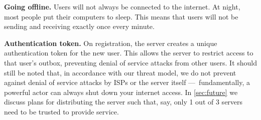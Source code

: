 
\textbf{Going offline.} Users will not always be connected to the internet. At night, most people put their computers to sleep. This means that users will not be sending and receiving exactly once every minute.  

\textbf{Authentication token.} 
On registration, the server creates a unique authentication token for the new user. This allows the server to restrict access to that user's outbox, preventing denial of service attacks from other users. It should still be noted that, in accordance with our threat model, we do not prevent against denial of service attacks by ISPs or the server itself — fundamentally, a powerful actor can always shut down your internet access. In \cref{sec:future} we discuss plans for distributing the server such that, say, only 1 out of 3 servers need to be trusted to provide service.

